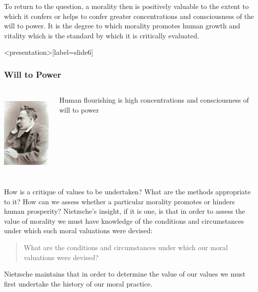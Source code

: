 To return to the question, a morality then is positively valuable to the extent to which it confers or helps to confer greater concentrations and consciousness of the will to power. It is the degree to which morality promotes human growth and vitality which is the standard by which it is critically evaluated. \change

\begin{frame}<presentation>[label=slide6]
    \frametitle{Will to Power}
        \begin{columns}
            \begin{column}{3cm}
                \includegraphics[height=4cm]{../../../graphics/nietzsche.jpg}
            \end{column}
            \begin{column}{7cm}
                Human flourishing is high concentrations and consciousness of \alert{will to power}
            \end{column}
        \end{columns}
\end{frame}

How is a critique of values to be undertaken? What are the methods appropriate to it? How can we assess whether a particular morality promotes or hinders human prosperity? Nietzsche's insight, if it is one, is that in order to assess the value of morality we must have knowledge of the conditions and circumstances under which such moral valuations were devised:
\begin{quote}
    What are the conditions and circumstances under which our moral valuations were devised?
\end{quote}
Nietzsche maintains that in order to determine the value of our values we must first undertake the history of our moral practice.

